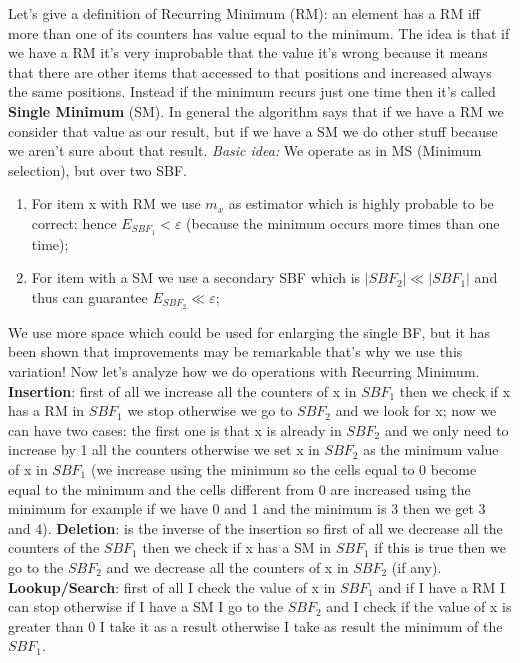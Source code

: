 Let's give a definition of Recurring Minimum (RM): an element has a RM iff more than one of its counters has value equal to the minimum. The idea is that if we have a RM it's very improbable that the value it's wrong because it means that there are other items that accessed to that positions and increased always the same positions.\newline
Instead if the minimum recurs just one time then it's called \textbf{Single Minimum} (SM). In general the algorithm says that if we have a RM we consider that value as our result, but if we have a SM we do other stuff because we aren't sure about that result.\newline
\textit{Basic idea:} We operate as in MS (Minimum selection), but over two SBF.
\begin{enumerate}
    \item For item x with RM we use $m_x$ as estimator which is highly probable to be correct: hence $E_{SBF_1} < \varepsilon$ (because the minimum occurs more times than one time);
    \item For item with a SM we use a secondary SBF which is $|SBF_2| \ll |SBF_1|$ and thus can guarantee $E_{SBF_2} \ll \varepsilon$;
\end{enumerate}
We use more space which could be used for enlarging the single BF, but it has been shown that improvements may be remarkable that's why we use this variation!\newline
Now let's analyze how we do operations with Recurring Minimum.\newline
\textbf{Insertion}: first of all we increase all the counters of x in $SBF_1$ then we check if x has a RM in $SBF_1$ we stop otherwise we go to $SBF_2$ and we look for x; now we can have two cases: the first one is that x is already in $SBF_2$ and we only need to increase by 1 all the counters otherwise we set x in $SBF_2$ as the minimum value of x in $SBF_1$ (we increase using the minimum so the cells equal to 0 become equal to the minimum and the cells different from 0 are increased using the minimum for example if we have 0 and 1 and the minimum is 3 then we get 3 and 4).\newline
\textbf{Deletion}: is the inverse of the insertion so first of all we decrease all the counters of the $SBF_1$ then we check if x has a SM in $SBF_1$ if this is true then we go to the $SBF_2$ and we decrease all the counters of x in $SBF_2$ (if any).\newline
\textbf{Lookup/Search}: first of all I check the value of x in $SBF_1$ and if I have a RM I can stop otherwise if I have a SM I go to the $SBF_2$ and I check if the value of x is greater than 0 I take it as a result otherwise I take as result the minimum of the $SBF_1$.\newline

